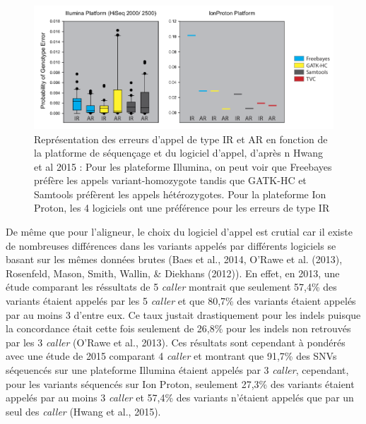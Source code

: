\documentclass[12pt,twoside]{reedthesis}
\theoremstyle{definition}
\theoremstyle{definition}
\theoremstyle{remark}
\begin{document}
  \begin{figure}
  
  {\centering \includegraphics[scale=.50]{figure/snp_error_type} 
  
  }
  
  \caption[Représentation des erreurs d'appel de type IR et AR en fonction de la platforme de séquençage et du logiciel d'appel, d'après n Hwang et al 2015]{Représentation des erreurs d'appel de type IR et AR en fonction de la platforme de séquençage et du logiciel d'appel, d'après n Hwang et al 2015 : Pour les plateforme Illumina, on peut voir que Freebayes préfère les appels variant-homozygote tandis que GATK-HC et Samtools préfèrent les appels hétérozygotes. Pour la plateforme Ion Proton, les 4 logiciels ont une préférence pour les erreurs de type IR}\label{fig:snperror}
  \end{figure}
  
  De même que pour l'aligneur, le choix du logiciel d'appel est crutial
  car il existe de nombreuses différences dans les variants appelés par
  différents logiciels se basant sur les mêmes données brutes (Baes et
  al., 2014, O'Rawe et al. (2013), Rosenfeld, Mason, Smith, Wallin, \&
  Diekhans (2012)). En effet, en 2013, une étude comparant les réssultats
  de 5 \emph{caller} montrait que seulement 57,4\% des variants étaient
  appelés par les 5 \emph{caller} et que 80,7\% des variants étaient
  appelés par au moins 3 d'entre eux. Ce taux justait drastiquement pour
  les indels puisque la concordance était cette fois seulement de 26,8\%
  pour les indels non retrouvés par les 3 \emph{caller} (O'Rawe et al.,
  2013). Ces résultats sont cependant à pondérés avec une étude de 2015
  comparant 4 \emph{caller} et montrant que 91,7\% des SNVs séqeuencés sur
  une plateforme Illumina étaient appelés par 3 \emph{caller}, cependant,
  pour les variants séquencés sur Ion Proton, seulement 27,3\% des
  variants étaient appelés par au moins 3 \emph{caller} et 57,4\% des
  variants n'étaient appelés que par un seul des \emph{caller} (Hwang et
  al., 2015).
  
\end{document}
